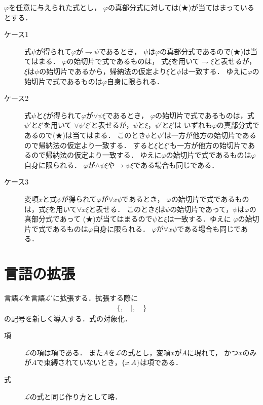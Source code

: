 \documentclass[a4j,10.5pt,oneside,openany]{jsbook}
\begin{document}
	$\varphi$を任意に与えられた式とし，
	$\varphi$の真部分式に対しては(★)が当てはまっているとする．
	\begin{description}
		\item[ケース1] 式$\psi$が得られて$\varphi$が$\rightharpoondown \psi$であるとき，
			$\psi$は$\varphi$の真部分式であるので(★)は当てはまる．
			$\varphi$の始切片で式であるものは，
			式$\xi$を用いて$\rightharpoondown \xi$と表せるが，
			$\xi$は$\psi$の始切片であるから，帰納法の仮定より$\xi$と$\psi$は一致する．
			ゆえに$\varphi$の始切片で式であるものは$\varphi$自身に限られる．
			
		\item[ケース2] 式$\psi$と$\xi$が得られて$\varphi$が$\vee \psi \xi$であるとき，
			$\varphi$の始切片で式であるものは，式$\psi'$と$\xi'$を用いて
			$\vee \psi' \xi'$と表せるが，$\psi$と$\xi$，$\psi'$と$\xi'$は
			いずれも$\varphi$の真部分式であるので(★)は当てはまる．
			このとき$\psi$と$\psi'$は一方が他方の始切片であるので帰納法の仮定より一致する．
			すると$\xi$と$\xi'$も一方が他方の始切片であるので帰納法の仮定より一致する．
			ゆえに$\varphi$の始切片で式であるものは$\varphi$自身に限られる．
			$\varphi$が$\wedge \psi \xi$や$\rightarrow \psi \xi$である場合も同じである．
			
		\item[ケース3] 変項$x$と式$\psi$が得られて$\varphi$が$\forall x \psi$であるとき，
			$\varphi$の始切片で式であるものは，式$\xi$を用いて$\forall x \xi$と表せる．
			このとき$\xi$は$\psi$の始切片であって，$\psi$は$\varphi$の真部分式であって
			(★)が当てはまるので$\psi$と$\xi$は一致する．ゆえに
			$\varphi$の始切片で式であるものは$\varphi$自身に限られる．
			$\varphi$が$\forall x \psi$である場合も同じである．
	\end{description}
	
\section{言語の拡張}
	言語$\mathcal{L}$を言語$\mathcal{L}'$に拡張する．拡張する際に
	\begin{align}
		\{, \quad |, \quad \}
	\end{align}
	の記号を新しく導入する．式の対象化．
	
	\begin{description}
		\item[項] $\mathcal{L}$の項は項である．
			また$A$を$\mathcal{L}$の式とし，変項$x$が$A$に現れて，
			かつ$x$のみが$A$で束縛されていないとき，$\{x|A\}$は項である．
		
		\item[式] $\mathcal{L}$の式と同じ作り方として略．
	\end{description}
	
\end{document}
